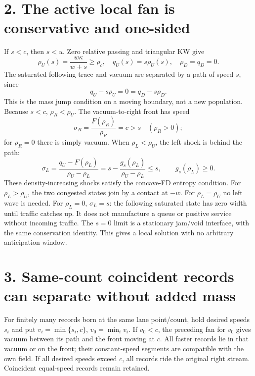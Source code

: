\documentclass[11pt,a4paper]{article}
\begin{document}
\newpage
\section*{2. The active local fan is conservative and one-sided}
If $s<c$, then $s<u$. Zero relative passing and triangular KW give
\begin{equation}
 \rho_U(s)=\frac{w\kappa}{w+s}\ge\rho_c,\quad
 q_U(s)=s\rho_U(s),\quad \rho_D=q_D=0.
\end{equation}
The saturated following trace and vacuum are separated by a path of speed
$s$, since
\begin{equation}
 q_U-s\rho_U=0=q_D-s\rho_D.
\end{equation}
This is the mass jump condition on a moving boundary, not a new population.
Because $s<c$, $\rho_R<\rho_U$. The vacuum-to-right front has speed
\begin{equation}
 \sigma_R=\frac{F(\rho_R)}{\rho_R}=c>s
 \quad(\rho_R>0);
\end{equation}
for $\rho_R=0$ there is simply vacuum. When $\rho_L<\rho_U$, the left shock
is behind the path:
\begin{equation}
 \sigma_L=\frac{q_U-F(\rho_L)}{\rho_U-\rho_L}
 =s-\frac{g_s(\rho_L)}{\rho_U-\rho_L}\le s,
 \qquad g_s(\rho_L)\ge0.
\end{equation}
These density-increasing shocks satisfy the concave-FD entropy condition.
For $\rho_L>\rho_U$, the two congested states join by a contact at $-w$.
For $\rho_L=\rho_U$ no left wave is needed. For $\rho_L=0$, $\sigma_L=s$:
the following saturated state has zero width until traffic catches up. It
does not manufacture a queue or positive service without incoming traffic.
The $s=0$ limit is a stationary jam/void interface, with the same conservation
identity. This gives a local solution with no arbitrary anticipation window.

\section*{3. Same-count coincident records can separate without added mass}
For finitely many records born at the same lane point/count, hold desired
speeds $s_i$ and put $v_i=\min\{s_i,c\}$, $v_0=\min_i v_i$.
If $v_0<c$, the preceding fan for $v_0$ gives vacuum between its path and
the front moving at $c$. All faster records lie in that vacuum or on the
front; their constant-speed segments are compatible with the own field.
If all desired speeds exceed $c$, all records ride the original right stream.
Coincident equal-speed records remain retained.
\end{document}
